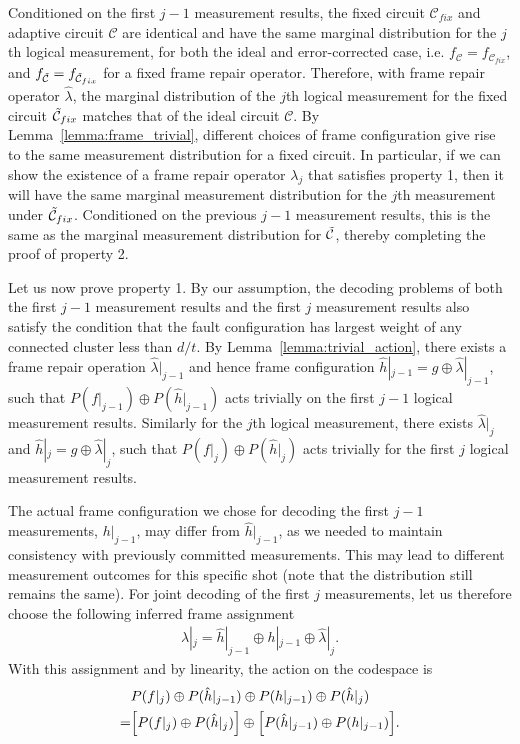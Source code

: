 Conditioned on the first $j-1$ measurement results, the fixed circuit $\mathcal{C}_{fix}$ and adaptive circuit $\mathcal{C}$ are identical and have the same marginal distribution for the $j$th logical measurement, for both the ideal and error-corrected case, i.e. $f_{\mathcal{C}}=f_{\mathcal{C}_{fix}}$, and $f_{\tilde{\mathcal{C}}}=f_{\tilde{\mathcal{C}}_{fix}}$ for a fixed frame repair operator.
%
Therefore, with frame repair operator $\hat{\lambda}$, the marginal distribution of the $j$th logical measurement for the fixed circuit $\tilde{\mathcal{C}}_{fix}$ matches that of the ideal circuit $\mathcal{C}$.
%
By Lemma~\ref{lemma:frame_trivial}, different choices of frame configuration give rise to the same measurement distribution for a fixed circuit.
%
In particular, if we can show the existence of a frame repair operator $\lambda_j$ that satisfies property 1, then it will have the same marginal measurement distribution for the $j$th measurement under $\tilde{\mathcal{C}}_{fix}$.
%
Conditioned on the previous $j-1$ measurement results, this is the same as the marginal measurement distribution for $\tilde{\mathcal{C}}$, thereby completing the proof of property 2.

Let us now prove property 1.
%
By our assumption, the decoding problems of both the first $j-1$ measurement results and the first $j$ measurement results also satisfy the condition that the fault configuration has largest weight of any connected cluster less than $d/t$.
%
By Lemma~\ref{lemma:trivial_action}, there exists a frame repair operation $\hat{\lambda}|_{j-1}$ and hence frame configuration $\hat{h}|_{j-1}=g\oplus\hat{\lambda}|_{j-1}$, such that $P(f|_{j-1})\oplus P(\hat{h}|_{j-1})$ acts trivially on the first $j-1$ logical measurement results.
%
Similarly for the $j$th logical measurement, there exists $\hat{\lambda}|_j$ and $\hat{h}|_j=g\oplus\hat{\lambda}|_j$, such that $P(f|_j)\oplus P(\hat{h}|_j)$ acts trivially for the first $j$ logical measurement results.

The actual frame configuration we chose for decoding the first $j-1$ measurements, $h|_{j-1}$, may differ from $\hat{h}|_{j-1}$, as we needed to maintain consistency with previously committed measurements.
%
This may lead to different measurement outcomes for this specific shot (note that the distribution still remains the same).
%
For joint decoding of the first $j$ measurements, let us therefore choose the following inferred frame assignment
\begin{align}
\lambda|_j=\hat{h}|_{j-1}\oplus h|_{j-1}\oplus \hat{\lambda}|_j.
\end{align}
%
With this assignment and by linearity, the action on the codespace is
\begin{align}
&P(f|_j)\oplus P(\hat{h}|_{j-1})\oplus P(h|_{j-1})\oplus P(\hat{h}|_j)\nonumber\\
=&\qty[P(f|_j)\oplus P(\hat{h}|_j)]\oplus\qty[P(\hat{h}|_{j-1})\oplus P(h|_{j-1})].
\end{align}

